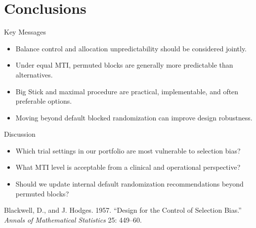 \documentclass[
  11pt,
  ignorenonframetext,
  aspectratio=169,
]{beamer}
\providecommand{\tightlist}{%
  \setlength{\itemsep}{0pt}\setlength{\parskip}{0pt}}
\newlength{\cslhangindent}
\newenvironment{cslreferences}%
  {\setlength{\parindent}{0pt}%
  \everypar{\setlength{\hangindent}{\cslhangindent}}\ignorespaces}%
  {\par}
\begin{document}
\hypertarget{conclusions}{%
\section{Conclusions}\label{conclusions}}

\begin{frame}{Key Messages}
\protect\hypertarget{key-messages}{}
\begin{itemize}
\tightlist
\item
  Balance control and allocation unpredictability should be considered
  jointly.
\item
  Under equal MTI, permuted blocks are generally more predictable than
  alternatives.
\item
  Big Stick and maximal procedure are practical, implementable, and
  often preferable options.
\item
  Moving beyond default blocked randomization can improve design
  robustness.
\end{itemize}
\end{frame}

\begin{frame}{Discussion}
\protect\hypertarget{discussion}{}
\begin{itemize}
\tightlist
\item
  Which trial settings in our portfolio are most vulnerable to selection
  bias?
\item
  What MTI level is acceptable from a clinical and operational
  perspective?
\item
  Should we update internal default randomization recommendations beyond
  permuted blocks?
\end{itemize}

\hypertarget{refs}{}
\begin{cslreferences}
\leavevmode\hypertarget{ref-Blackwell1957}{}%
Blackwell, D., and J. Hodges. 1957. ``Design for the Control of
Selection Bias.'' \emph{Annals of Mathematical Statistics} 25: 449--60.
\end{cslreferences}
\end{frame}
\end{document}
